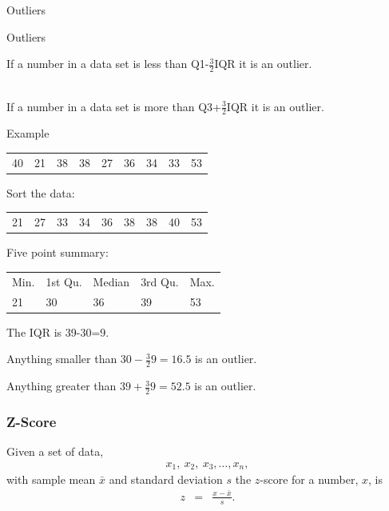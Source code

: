 \begin{frame}{Outliers}

  \begin{definition}{Outliers}

    If a number in a data set is less than Q1-$\frac{3}{2}$IQR it is
    an outlier.

    ~ \\

    If a number in a data set is more than Q3+$\frac{3}{2}$IQR it is
    an outlier.

  \end{definition}
  
\end{frame}

\begin{frame}{Example}

  \begin{tabular}{lllllllll}
    40 & 21 & 38 & 38 & 27 & 36 & 34 & 33 & 53 
  \end{tabular}

  {
    Sort the data: \\
    \begin{tabular}{lllllllll}
      21 & 27 & 33 & 34 & 36 & 38 & 38 & 40 & 53
    \end{tabular}

    Five point summary: \\
    \begin{tabular}{lllll}
      Min. & 1st Qu. & Median    & 3rd Qu. &   Max. \\
      21   & 30      & 36        & 39     & 53
    \end{tabular}
    
    The IQR is 39-30=9.

    Anything smaller than $30-\frac{3}{2}9=16.5$ is an outlier.

    Anything greater than $39+\frac{3}{2}9=52.5$ is an outlier.

  }
  
\end{frame}


\begin{frame}
  \frametitle{Z-Score}

  \begin{definition}
    Given a set of data,
    \begin{eqnarray*}
      x_1,~x_2,~x_3,\ldots,x_n,
    \end{eqnarray*}
    with sample mean $\bar{x}$ and standard deviation $s$ the
    $z$-score for a number, $x$, is
    \begin{eqnarray*}
      z & = & \frac{x-\bar{x}}{s}.
    \end{eqnarray*}
  \end{definition}

\end{frame}


